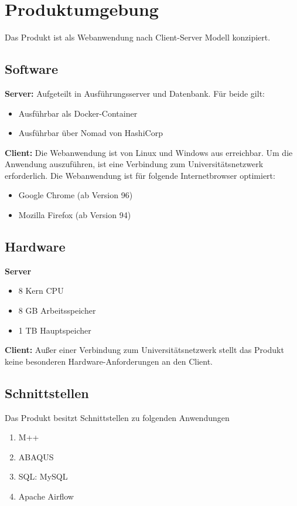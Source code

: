 \chapter{Produktumgebung}
Das Produkt ist als Webanwendung nach \gls{Client-Server} Modell konzipiert.

\section{Software}
\textbf{Server:}
Aufgeteilt in Ausführungsserver und Datenbank. Für beide gilt:
\begin{itemize} %
    \setlength\itemsep{-1em}
    \item Ausführbar als Docker-Container
    \item Ausführbar über Nomad von HashiCorp
\end{itemize}
\textbf{Client:} Die Webanwendung ist von Linux und Windows aus erreichbar. 
Um die Anwendung auszuführen, ist eine Verbindung zum Universitätsnetzwerk erforderlich.
Die Webanwendung ist für folgende Internetbrowser optimiert:
\begin{itemize}
    \setlength\itemsep{-1em}
    \item Google Chrome (ab Version 96)
    \item Mozilla Firefox (ab Version 94) %
\end{itemize}

\section{Hardware}
\textbf{Server}
\begin{itemize}
    \setlength\itemsep{-1em}
    \item 8 Kern CPU
    \item 8 GB Arbeitsspeicher
    \item 1 TB Hauptspeicher
\end{itemize}

\textbf{Client:}
Außer einer Verbindung zum Universitätsnetzwerk stellt das Produkt keine besonderen Hardware-Anforderungen an den Client.

\section{Schnittstellen}
\renewcommand{\labelenumi}{/S\arabic{enumi}0/}
Das Produkt besitzt Schnittstellen zu folgenden Anwendungen
\begin{enumerate}
    \setlength\itemsep{-1em}
    \item \gls{M++}
    \item \gls{ABAQUS}
    \item \gls{SQL}: MySQL
    \item \gls{Apache Airflow}
\end{enumerate}
